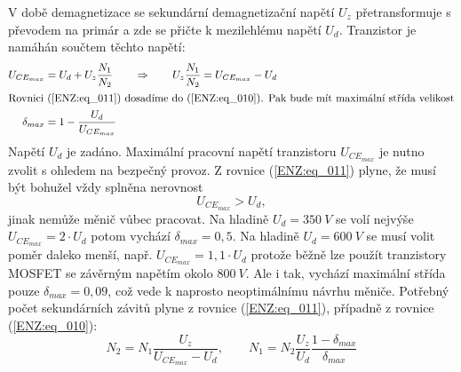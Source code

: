   V době demagnetizace se sekundární demagnetizační napětí \(U_z\) přetransformuje s převodem na 
  primár a zde se přičte k mezilehlému napětí \(U_d\). Tranzistor je namáhán součtem těchto 
  napětí:
  \begin{align}
    U_{CE_{max}} &= U_d + U_z\frac{N_1}{N_2}   \qquad \Rightarrow \qquad 
    U_z\frac{N_1}{N_2} = U_{CE_{max}} - U_d    \label{ENZ:eq_011} \\
    \shortintertext{Rovnici (\ref{ENZ:eq_011}) dosadíme do (\ref{ENZ:eq_010}). Pak bude mít 
                    maximální střída velikost}
    \delta_{max} &= 1-\frac{U_d}{U_{CE_{max}}} \label{ENZ:eq_030}
  \end{align}
  Napětí \(U_d\) je zadáno. Maximální pracovní napětí tranzistoru \(U_{CE_{max}}\) je nutno 
  zvolit s ohledem na bezpečný provoz. Z rovnice (\ref{ENZ:eq_011}) plyne, že musí být bohužel 
  vždy splněna nerovnost
  \begin{equation}\label{ENZ:eq_012}
   U_{CE_{max}} > U_d,
  \end{equation}
  jinak nemůže měnič vůbec pracovat. Na hladině \(U_d = \SI{350}{V}\) se volí nejvýše 
  \(U_{CE_{max}} =  2\cdot U_d\) potom vychází \(\delta_{max} = 0,5\). Na hladině \(U_d = 
  \SI{600}{V}\) se musí volit poměr daleko menší, např. \(U_{CE_{max}} =  1,1\cdot U_d\) protože 
  běžně lze použít tranzistory MOSFET se závěrným napětím okolo \(\SI{800}{V}\). Ale i tak, 
  vychází maximální střída pouze \(\delta_{max} = 0,09\), což vede k naprosto neoptimálnímu 
  návrhu měniče. Potřebný počet sekundárních závitů plyne z rovnice (\ref{ENZ:eq_011}), případně 
  z rovnice (\ref{ENZ:eq_010}):
  \begin{equation}\label{ENZ:eq_013}
    N_2 = N_1\frac{U_z}{U_{CE_{max}}-U_d}, \qquad 
    N_1 = N_2\frac{U_z}{U_d}\frac{1-\delta_{max}}{\delta_{max}}
  \end{equation}
  
